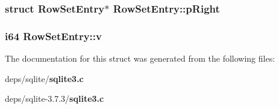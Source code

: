 \subsubsection{\setlength{\rightskip}{0pt plus 5cm}struct \bf{Row\-Set\-Entry}$\ast$ \bf{Row\-Set\-Entry::p\-Right}}\label{structRowSetEntry_0a6f0a5d3bf556983fcd55457b58f1c1}


\subsubsection{\setlength{\rightskip}{0pt plus 5cm}\bf{i64} \bf{Row\-Set\-Entry::v}}\label{structRowSetEntry_447f43caf34d5b83c84d66615776de6e}




The documentation for this struct was generated from the following files:\begin{CompactItemize}
\item 
deps/sqlite/\bf{sqlite3.c}\item 
deps/sqlite-3.7.3/\bf{sqlite3.c}\end{CompactItemize}

